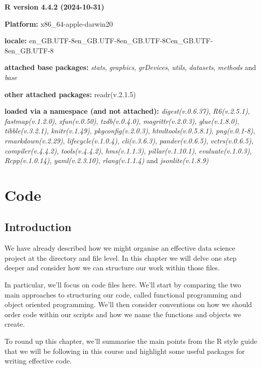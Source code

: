 \documentclass[
  letterpaper,
  DIV=11,
  numbers=noendperiod]{scrreprt}
\begin{document}
\textbf{R version 4.4.2 (2024-10-31)}

\textbf{Platform:} x86\_64-apple-darwin20

\textbf{locale:}
en\_GB.UTF-8\textbar\textbar en\_GB.UTF-8\textbar\textbar en\_GB.UTF-8\textbar\textbar C\textbar\textbar en\_GB.UTF-8\textbar\textbar en\_GB.UTF-8

\textbf{attached base packages:} \emph{stats}, \emph{graphics},
\emph{grDevices}, \emph{utils}, \emph{datasets}, \emph{methods} and
\emph{base}

\textbf{other attached packages:} readr(v.2.1.5)

\textbf{loaded via a namespace (and not attached):}
\emph{digest(v.0.6.37)}, \emph{R6(v.2.5.1)}, \emph{fastmap(v.1.2.0)},
\emph{xfun(v.0.50)}, \emph{tzdb(v.0.4.0)}, \emph{magrittr(v.2.0.3)},
\emph{glue(v.1.8.0)}, \emph{tibble(v.3.2.1)}, \emph{knitr(v.1.49)},
\emph{pkgconfig(v.2.0.3)}, \emph{htmltools(v.0.5.8.1)},
\emph{png(v.0.1-8)}, \emph{rmarkdown(v.2.29)},
\emph{lifecycle(v.1.0.4)}, \emph{cli(v.3.6.3)}, \emph{pander(v.0.6.5)},
\emph{vctrs(v.0.6.5)}, \emph{compiler(v.4.4.2)}, \emph{tools(v.4.4.2)},
\emph{hms(v.1.1.3)}, \emph{pillar(v.1.10.1)}, \emph{evaluate(v.1.0.3)},
\emph{Rcpp(v.1.0.14)}, \emph{yaml(v.2.3.10)}, \emph{rlang(v.1.1.4)} and
\emph{jsonlite(v.1.8.9)}

\chapter{Code}\label{workflows-code}

\section{Introduction}\label{introduction-2}

We have already described how we might organise an effective data
science project at the directory and file level. In this chapter we will
delve one step deeper and consider how we can structure our work within
those files.

In particular, we'll focus on code files here. We'll start by comparing
the two main approaches to structuring our code, called functional
programming and object oriented programming. We'll then consider
conventions on how we should order code within our scripts and how we
name the functions and objects we create.

To round up this chapter, we'll summarise the main points from the R
style guide that we will be following in this course and highlight some
useful packages for writing effective code.
\end{document}
